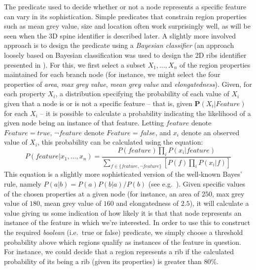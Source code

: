 The predicate used to decide whether or not a node represents a specific feature can vary in its sophistication. Simple predicates that constrain region properties such as mean grey value, size and location often work surprisingly well, as will be seen when the 3D spine identifier is described later. A slightly more involved approach is to design the predicate using a \emph{Bayesian classifier} (an approach loosely based on Bayesian classification was used to design the 2D ribs identifier presented in \cite{gvccimi08}). For this, we first select a subset $X_1,\ldots,X_n$ of the region properties maintained for each branch node (for instance, we might select the four properties of \emph{area}, \emph{max grey value}, \emph{mean grey value} and \emph{elongatedness}). Given, for each property $X_i$, a distribution specifying the probability of each value of $X_i$ given that a node is or is not a specific feature -- that is, given $\mathbf{P}(X_i | \textit{Feature})$ for each $X_i$ -- it is possible to calculate a probability indicating the likelihood of a given node being an instance of that feature. Letting $\mathit{feature}$ denote $\mathit{Feature} = \mathit{true}$, $\neg \mathit{feature}$ denote $\mathit{Feature} = \mathit{false}$, and $x_i$ denote an observed value of $X_i$, this probability can be calculated using the equation:
%
\[
P(\mathit{feature}|x_1,\ldots,x_n) = \frac{P(\mathit{feature}) \displaystyle \prod_i P(x_i|\mathit{feature})}{\displaystyle \sum_{f \in \{\mathit{feature},\neg \mathit{feature}\}} \left[ P(f) \displaystyle \prod_i P(x_i|f) \right]}
\]
%
This equation is a slightly more sophisticated version of the well-known Bayes' rule, namely $P(a|b) = P(a) P(b|a) / P(b)$ (see e.g.~\cite{aima}). Given specific values of the chosen properties at a given node (for instance, an area of $250$, max grey value of $180$, mean grey value of $160$ and elongatedness of $2.5$), it will calculate a value giving us some indication of how likely it is that that node represents an instance of the feature in which we're interested. In order to use this to construct the required \emph{boolean} (i.e.~true or false) predicate, we simply choose a threshold probability above which regions qualify as instances of the feature in question. For instance, we could decide that a region represents a rib if the calculated probability of its being a rib (given its properties) is greater than $80\%$.

